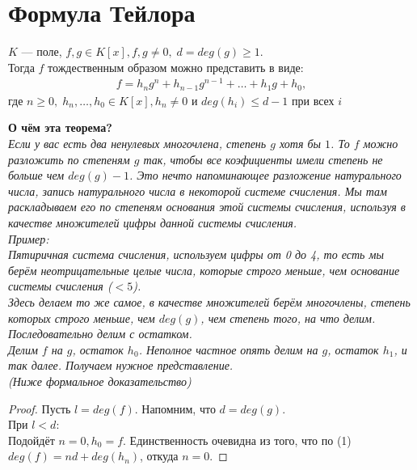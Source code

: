 
\section{Формула Тейлора}

\begin{normalsize}

    \begin{theorem-non}
        $K$ --- поле, $f,g \in K[x], f,g \neq 0,\; d = deg(g) \geqslant 1.$ \\
        Тогда $f$ тождественным образом можно представить в виде:
        \begin{align}
            f = h_ng^n + h_{n-1}g^{n-1} + \dots + h_1g + h_0,
        \end{align}
        где $n \geqslant 0,\; h_n, \dots, h_0 \in K[x], h_n \neq 0$ и $deg(h_i) \leqslant d - 1$ при всех $i$
    \end{theorem-non}

    \textbf{О чём эта теорема?} \\
    \emph{Если у вас есть два ненулевых многочлена, степень $g$ хотя бы $1$. То $f$ можно разложить по степеням $g$ так,
    чтобы все коэфициенты имели степень не больше чем $deg(g) - 1$.
    Это нечто напоминающее разложение натурального числа, запись натурального числа в некоторой системе счисления. Мы там раскладываем
    его по степеням основания этой системы счисления, используя в качестве множителей цифры данной системы счисления.} \\
    \emph{Пример: \\
    Пятиричная система счисления, используем цифры от 0 до 4, то есть мы берём неотрицательные целые числа,
    которые строго меньше, чем основание системы счисления ($< 5$). \\
    }
    \emph{ Здесь делаем то же самое, в качестве множителей берём многочлены,
    степень которых строго меньше, чем $deg(g)$, чем степень того, на что делим.
    Последовательно делим с остатком. \\
    Делим  $f$ на $g$, остаток $h_0$.
    Неполное частное опять делим на $g$, остаток $h_1$, и так далее.
    Получаем нужное представление. \\
    (Ниже формальное доказательство)
    }

    \begin{proof}
        Пусть $l = deg(f)$. Напомним, что $d = deg(g)$. \\
        При $l < d$: \\
        Подойдёт $n = 0, h_0 = f$. Единственность очевидна из того, что по (1) $deg(f) = nd + deg(h_n)$, откуда $n=0$.
        

\end{proof}
\end{normalsize}
